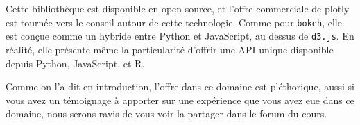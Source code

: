 Cette bibliothèque est disponible en open source, et l'offre commerciale
de plotly est tournée vers le conseil autour de cette technologie. Comme
pour \texttt{bokeh}, elle est conçue comme un hybride entre Python et
JavaScript, au dessus de \texttt{d3.js}. En réalité, elle présente même
la particularité d'offrir une API unique disponible depuis Python,
JavaScript, et R.

    Comme on l'a dit en introduction, l'offre dans ce domaine est
pléthorique, aussi si vous avez un témoignage à apporter sur une
expérience que vous avez eue dans ce domaine, nous serons ravis de vous
voir la partager dans le forum du cours.


    
    
    
